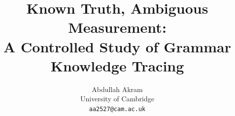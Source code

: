 \documentclass[11pt]{article}
\title{Known Truth, Ambiguous Measurement:\\
A Controlled Study of Grammar Knowledge Tracing}
\author{Abdullah Akram \\
  University of Cambridge \\
  \texttt{aa2527@cam.ac.uk}}
\begin{document}
\maketitle

\begin{abstract}

\end{abstract}














\appendix

\end{document}
